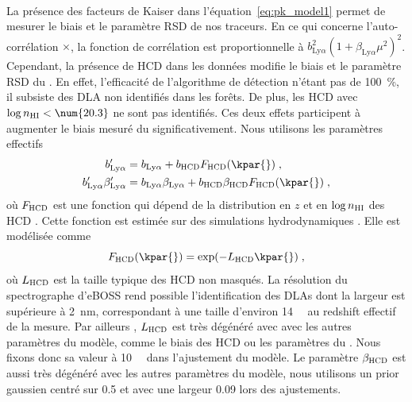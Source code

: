 \paragraph{}
La présence des facteurs de Kaiser dans l'équation~\ref{eq:pk_model1} permet de mesurer le biais et le paramètre RSD de nos traceurs. En ce qui concerne l'auto-corrélation \lya{}$\times$\lya{}, la fonction de corrélation est proportionnelle à $b_{\mathrm{Ly}\alpha}^2(1+\beta_{\mathrm{Ly}\alpha} \mu^2)^2$. Cependant, la présence de HCD dans les données modifie le biais et le paramètre RSD du \lya{}. En effet, l'efficacité de l'algorithme de détection n'étant pas de \SI{100}{\percent}, il subsiste des DLA non identifiés dans les forêts. De plus, les HCD avec $\log n_{\textsc{HI}} < \num{20.3}$ ne sont pas identifiés. Ces deux effets participent à augmenter le biais mesuré du \lya{} significativement. Nous utilisons les paramètres effectifs
\begin{align}
  \label{eq:bias_hcd_def}
  b_{\mathrm{Ly}\alpha}' &= b_{\mathrm{Ly}\alpha} + b_{\textsc{HCD}} F_{\textsc{HCD}}(\kpar{}) \; , \\
  b_{\mathrm{Ly}\alpha}' \beta_{\mathrm{Ly}\alpha}' &= b_{\mathrm{Ly}\alpha} \beta_{\mathrm{Ly}\alpha} + b_{\textsc{HCD}} \beta_{\textsc{HCD}} F_{\textsc{HCD}}(\kpar{})  \; ,
\end{align}
où $F_{\textsc{HCD}}$ est une fonction qui dépend de la distribution en $z$ et en $\log n_{\textsc{HI}}$ des HCD \autocite{Font-Ribera2012a}. Cette fonction est estimée sur des simulations hydrodynamiques \autocite{Rogers2017}. Elle est modélisée comme
\begin{equation}
  \label{eq:f_hcd_def}
  F_{\textsc{HCD}}(\kpar{}) = \exp(- L_{\textsc{HCD}} \kpar{}) \; ,
\end{equation}
où $L_{\textsc{HCD}}$ est la taille typique des HCD non masqués. La résolution du spectrographe d'eBOSS rend possible l'identification des DLAs dont la largeur est supérieure à \SI{2}{\nano\meter}, correspondant à une taille d'environ \SI{14}{\perh\Mpc} au redshift effectif de la mesure. Par ailleurs , $L_{\textsc{HCD}}$ est très dégénéré avec avec les autres paramètres du modèle, comme le biais des HCD ou les paramètres du \lya{}. Nous fixons donc sa valeur à \SI{10}{\perh\Mpc} dans l'ajustement du modèle. Le paramètre $\beta_{\textsc{HCD}}$ est aussi très dégénéré avec les autres paramètres du modèle, nous utilisons un prior gaussien centré sur \num{0.5} et avec une largeur \num{0.09} lors des ajustements.

